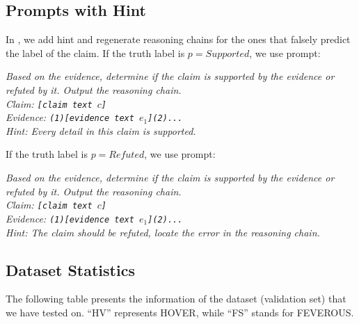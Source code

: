 \subsection{Prompts with Hint}\label{sec:prompthint}
In \themodel, we add hint and regenerate reasoning chains for the ones that falsely predict the label of the claim. If the truth label is $p=\textit{Supported}$, we use prompt:
\begin{mybox}
\textit{Based on the evidence, determine if the claim is supported by the evidence or refuted by it. Output the reasoning chain.\\
Claim: \texttt{[claim text $c$]}\\
Evidence: \texttt{(1)[evidence text $e_1$](2)...}}\\
\textit{Hint: Every detail in this claim is supported.}
\end{mybox}
If the truth label is $p=\textit{Refuted}$, we use prompt:
\begin{mybox}
\textit{Based on the evidence, determine if the claim is supported by the evidence or refuted by it. Output the reasoning chain.\\
Claim: \texttt{[claim text $c$]}\\
Evidence: \texttt{(1)[evidence text $e_1$](2)...}}\\
\textit{Hint: The claim should be refuted, locate the error in the reasoning chain.}
\end{mybox}

\subsection{Dataset Statistics}\label{sec:datasetinfo}
The following table presents the information of the dataset (validation set) that we have tested on. ``HV'' represents HOVER, while ``FS'' stands for FEVEROUS.
\begin{table}[h]  
  \centering  
  \label{tab:datasets}  
\end{table}

